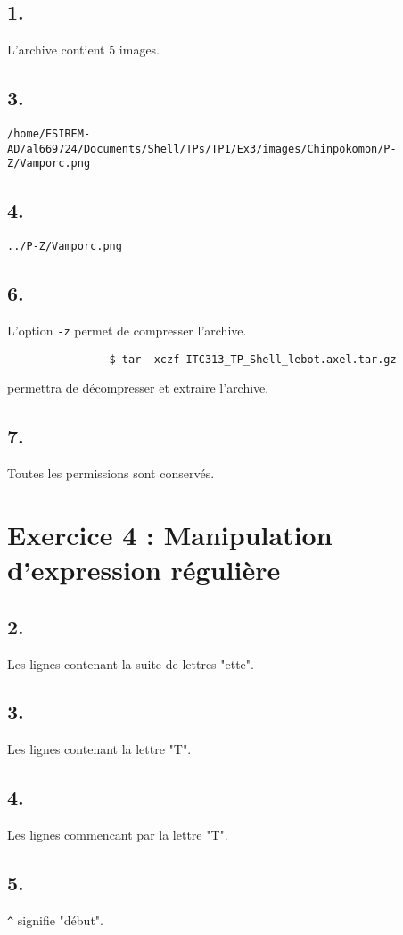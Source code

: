         \subsection{1.}
            L'archive contient 5 images.
        \subsection{3.}
            \texttt{/home/ESIREM-AD/al669724/Documents/Shell/TPs/TP1/Ex3/images/Chinpokomon/P-Z/Vamporc.png}
        \subsection{4.}
            \texttt{../P-Z/Vamporc.png}
        \subsection{6.}
            L'option \texttt{-z} permet de compresser l'archive.
            \begin{verbatim}
                $ tar -xczf ITC313_TP_Shell_lebot.axel.tar.gz
            \end{verbatim}
            permettra de décompresser et extraire l'archive.
        \subsection{7.}
            Toutes les permissions sont conservés.
    \section{Exercice 4 : Manipulation d'expression régulière}
        \subsection{2.}
            Les lignes contenant la suite de lettres "ette".
        \subsection{3.}
            Les lignes contenant la lettre "T".
        \subsection{4.}
            Les lignes commencant par la lettre "T".
        \subsection{5.}
            \texttt{\^} signifie "début".
